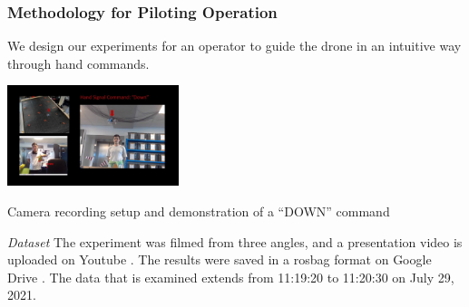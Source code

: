 

\subsubsection{Methodology for Piloting Operation}

We design our experiments for an operator to guide the drone in an intuitive way through hand commands. 



\begin{marginfigure}%
    \raggedright
    \includegraphics[width=5cm]{images/Signal_Mode.JPG}

    \caption{Camera recording setup and demonstration of a “DOWN” command}
\end{marginfigure}



\textit{Dataset}\hspace{0.5cm} The experiment was filmed from three angles, and a presentation video is uploaded on Youtube \cite{piloting_video}. The results were saved in a rosbag format on Google Drive \cite{piloting_data}. The data that is examined extends from 11:19:20 to 11:20:30 on July 29, 2021.  

